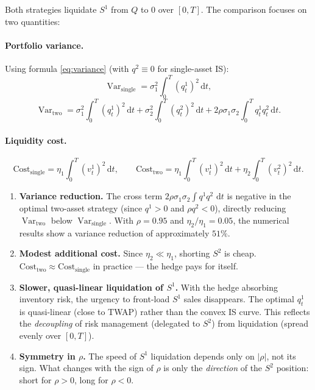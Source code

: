 \documentclass[12pt, a4paper]{article}
\newcommand{\Var}{\operatorname{Var}}
\newcommand{\dd}{\,\mathrm{d}}
\begin{document}
Both strategies liquidate $S^1$ from $Q$ to $0$ over $[0,T]$.
The comparison focuses on two quantities:

\paragraph{Portfolio variance.}
Using formula \eqref{eq:variance} (with $q^2 \equiv 0$ for single-asset IS):
\[
  \Var_{\mathrm{single}} = \sigma_1^2\int_0^T (q^1_t)^2 \dd t,
\]
\[
  \Var_{\mathrm{two}} = \sigma_1^2\int_0^T (q^1_t)^2 \dd t
  + \sigma_2^2\int_0^T (q^2_t)^2 \dd t
  + 2\rho\sigma_1\sigma_2\int_0^T q^1_t q^2_t \dd t.
\]

\paragraph{Liquidity cost.}
\[
  \mathrm{Cost}_{\mathrm{single}} = \eta_1\int_0^T (v^1_t)^2 \dd t,
  \qquad
  \mathrm{Cost}_{\mathrm{two}} = \eta_1\int_0^T (v^1_t)^2 \dd t
  + \eta_2\int_0^T (v^2_t)^2 \dd t.
\]

\begin{resultbox}
\begin{enumerate}[leftmargin=1.5em]
  \item \textbf{Variance reduction.}
        The cross term $2\rho\sigma_1\sigma_2\int q^1 q^2\,\dd t$ is negative
        in the optimal two-asset strategy (since $q^1 > 0$ and $\rho q^2 < 0$),
        directly reducing $\Var_{\mathrm{two}}$ below $\Var_{\mathrm{single}}$.
        With $\rho = 0.95$ and $\eta_2/\eta_1 = 0.05$, the numerical results
        show a variance reduction of approximately $51\%$.

  \item \textbf{Modest additional cost.}
        Since $\eta_2 \ll \eta_1$, shorting $S^2$ is cheap.
        $\mathrm{Cost}_{\mathrm{two}} \approx \mathrm{Cost}_{\mathrm{single}}$
        in practice — the hedge pays for itself.

  \item \textbf{Slower, quasi-linear liquidation of $S^1$.}
        With the hedge absorbing inventory risk, the urgency to front-load
        $S^1$ sales disappears. The optimal $q^1_t$ is quasi-linear
        (close to TWAP) rather than the convex IS curve. This reflects the
        \emph{decoupling} of risk management (delegated to $S^2$) from
        liquidation (spread evenly over $[0,T]$).

  \item \textbf{Symmetry in $\rho$.}
        The speed of $S^1$ liquidation depends only on $|\rho|$, not its sign.
        What changes with the sign of $\rho$ is only the \emph{direction}
        of the $S^2$ position: short for $\rho > 0$, long for $\rho < 0$.
\end{enumerate}
\end{resultbox}
\end{document}
